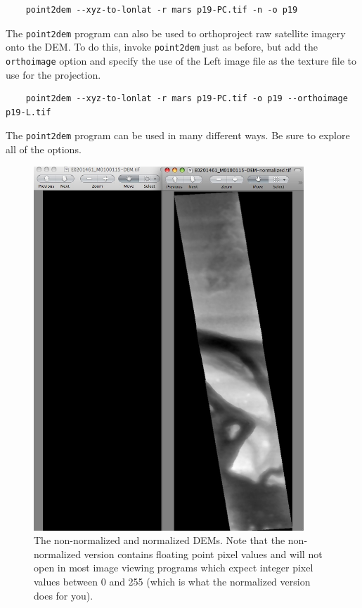 \begin{verbatim}
    point2dem --xyz-to-lonlat -r mars p19-PC.tif -n -o p19
\end{verbatim}

The \texttt{point2dem} program can also be used to orthoproject raw
satellite imagery onto the DEM. To do this, invoke \texttt{point2dem}
just as before, but add the \texttt{orthoimage} option and specify
the use of the Left image file as the texture file to use for the
projection.

\begin{verbatim}
    point2dem --xyz-to-lonlat -r mars p19-PC.tif -o p19 --orthoimage p19-L.tif 
\end{verbatim}

The \texttt{point2dem} program can be used in many different ways.
Be sure to explore all of the options.

\begin{figure}
\begin{center}
\includegraphics[width=4in]{images/p19-dems.png}
\caption[P19 dem images]{
    \label{p19-dems}
	The non-normalized and normalized DEMs. Note that the
	non-normalized version contains floating point pixel values
	and will not open in most image viewing programs which
	expect integer pixel values between 0 and 255 (which is
	what the normalized version does for you).
    }
\end{center}
\end{figure}

